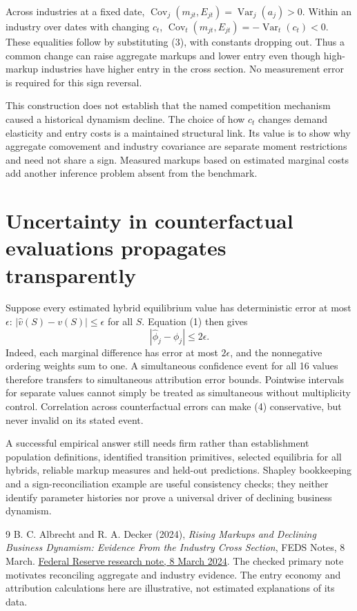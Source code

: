\documentclass[11pt,a4paper]{article}
\DeclareMathOperator{\Var}{Var}
\DeclareMathOperator{\Cov}{Cov}
\begin{document}
Across industries at a fixed date, $\Cov_j(m_{jt},E_{jt})=\Var_j(a_j)>0$. Within an industry over dates with changing $c_t$, $\Cov_t(m_{jt},E_{jt})=-\Var_t(c_t)<0$. These equalities follow by substituting (3), with constants dropping out. Thus a common change can raise aggregate markups and lower entry even though high-markup industries have higher entry in the cross section. No measurement error is required for this sign reversal.

This construction does not establish that the named competition mechanism caused a historical dynamism decline. The choice of how $c_t$ changes demand elasticity and entry costs is a maintained structural link. Its value is to show why aggregate comovement and industry covariance are separate moment restrictions and need not share a sign. Measured markups based on estimated marginal costs add another inference problem absent from the benchmark.

\section{Uncertainty in counterfactual evaluations propagates transparently}
Suppose every estimated hybrid equilibrium value has deterministic error at most $\epsilon$: $|\widehat v(S)-v(S)|\le\epsilon$ for all $S$. Equation (1) then gives
\[
 |\widehat\phi_j-\phi_j|\le2\epsilon. \tag{4}
\]
Indeed, each marginal difference has error at most $2\epsilon$, and the nonnegative ordering weights sum to one. A simultaneous confidence event for all 16 values therefore transfers to simultaneous attribution error bounds. Pointwise intervals for separate values cannot simply be treated as simultaneous without multiplicity control. Correlation across counterfactual errors can make (4) conservative, but never invalid on its stated event.

A successful empirical answer still needs firm rather than establishment population definitions, identified transition primitives, selected equilibria for all hybrids, reliable markup measures and held-out predictions. Shapley bookkeeping and a sign-reconciliation example are useful consistency checks; they neither identify parameter histories nor prove a universal driver of declining business dynamism.

\begin{thebibliography}{9}
 B. C. Albrecht and R. A. Decker (2024), \emph{Rising Markups and Declining Business Dynamism: Evidence From the Industry Cross Section}, FEDS Notes, 8 March. \href{https://www.federalreserve.gov/econres/notes/feds-notes/rising-markups-and-declining-business-dynamism-evidence-from-the-industry-cross-section-20240308.html}{Federal Reserve research note, 8 March 2024}. The checked primary note motivates reconciling aggregate and industry evidence. The entry economy and attribution calculations here are illustrative, not estimated explanations of its data.
\end{thebibliography}
\end{document}

